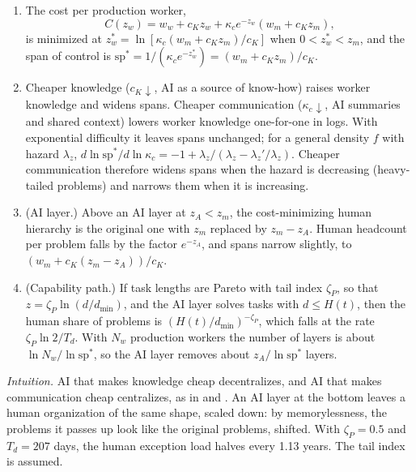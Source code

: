 \begin{proposition}\label{prop:ext-hierarchy}
\begin{enumerate}
\item[(a)] The cost per production worker,
\[
C(z_w)=w_w+c_Kz_w+\kappa_ce^{-z_w}(w_m+c_Kz_m),
\]
is minimized at $z_w^*=\ln[\kappa_c(w_m+c_Kz_m)/c_K]$ when $0<z_w^*<z_m$, and the span of control is $\mathrm{sp}^*=1/(\kappa_ce^{-z_w^*})=(w_m+c_Kz_m)/c_K$.
\item[(b)] Cheaper knowledge ($c_K\downarrow$, AI as a source of know-how) raises worker knowledge and widens spans. Cheaper communication ($\kappa_c\downarrow$, AI summaries and shared context) lowers worker knowledge one-for-one in logs. With exponential difficulty it leaves spans unchanged; for a general density $f$ with hazard $\lambda_z$, $d\ln\mathrm{sp}^*/d\ln\kappa_c=-1+\lambda_z/(\lambda_z-\lambda_z'/\lambda_z)$. Cheaper communication therefore widens spans when the hazard is decreasing (heavy-tailed problems) and narrows them when it is increasing.
\item[(c)] (AI layer.) Above an AI layer at $z_A<z_m$, the cost-minimizing human hierarchy is the original one with $z_m$ replaced by $z_m-z_A$. Human headcount per problem falls by the factor $e^{-z_A}$, and spans narrow slightly, to $(w_m+c_K(z_m-z_A))/c_K$.
\item[(d)] (Capability path.) If task lengths are Pareto with tail index $\zeta_P$, so that $z=\zeta_P\ln(d/d_{\min})$, and the AI layer solves tasks with $d\le H(t)$, then the human share of problems is $(H(t)/d_{\min})^{-\zeta_P}$, which falls at the rate $\zeta_P\ln2/T_d$. With $N_w$ production workers the number of layers is about $\ln N_w/\ln\mathrm{sp}^*$, so the AI layer removes about $z_A/\ln\mathrm{sp}^*$ layers.
\end{enumerate}
\end{proposition}

\noindent\emph{Intuition.} AI that makes knowledge cheap decentralizes, and AI that makes communication cheap centralizes, as in \citet{garicano2000hierarchies} and \citet{garicano2006organization}. An AI layer at the bottom leaves a human organization of the same shape, scaled down: by memorylessness, the problems it passes up look like the original problems, shifted. With $\zeta_P=0.5$ and $T_d=207$ days, the human exception load halves every 1.13 years. The tail index is assumed.

